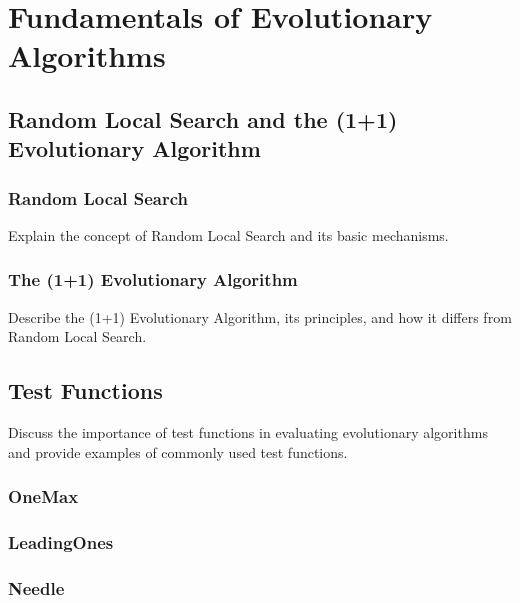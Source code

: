 \section{Fundamentals of Evolutionary Algorithms}
\subsection{Random Local Search and the (1+1) Evolutionary Algorithm}
\subsubsection{Random Local Search}
Explain the concept of Random Local Search and its basic mechanisms.

\subsubsection{The (1+1) Evolutionary Algorithm}
Describe the (1+1) Evolutionary Algorithm, its principles, and how it differs from Random Local Search.


\subsection{Test Functions}
Discuss the importance of test functions in evaluating evolutionary algorithms and provide examples of commonly used test functions.


\subsubsection{OneMax}

\subsubsection{LeadingOnes}

\subsubsection{Needle}

